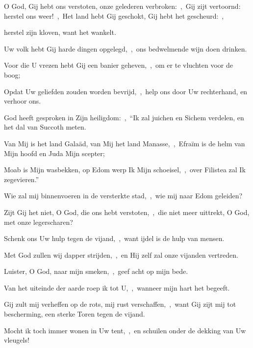 \documentclass[12pt,twoside,a5paper]{article}
\begin{document}


\begin{halfparskip}
  O God, Gij hebt ons verstoten, onze gelederen verbroken:~\sep\ Gij zijt vertoornd: herstel ons weer!~\sep\ Het land hebt Gij geschokt, Gij hebt het gescheurd:~\sep


  herstel zijn kloven, want het wankelt.

  Uw volk hebt Gij harde dingen opgelegd,~\sep\ ons bedwelmende wijn doen drinken.

  Voor die U vrezen hebt Gij een banier geheven,~\sep\ om er te vluchten voor de boog;

  Opdat Uw geliefden zouden worden bevrijd,~\sep\ help ons door Uw rechterhand, en verhoor ons.
\end{halfparskip}


\begin{halfparskip}
  God heeft gesproken in Zijn heiligdom:~\sep\ ``Ik zal juichen en Sichem verdelen, en het dal van Succoth meten.

  Van Mij is het land Galaäd, van Mij het land Manasse,~\sep\ Efraïm is de helm van Mijn hoofd en Juda Mijn scepter;

  Moab is Mijn wasbekken, op Edom werp Ik Mijn schoeisel,~\sep\ over Filistea zal Ik zegevieren.''

  Wie zal mij binnenvoeren in de versterkte stad,~\sep\ wie mij naar Edom geleiden?

  Zijt Gij het niet, O God, die ons hebt verstoten,~\sep\ die niet meer uittrekt, O God, met onze legerscharen?

  Schenk ons Uw hulp tegen de vijand,~\sep\ want ijdel is de hulp van mensen.

  Met God zullen wij dapper strijden,~\sep\ en Hij zelf zal onze vijanden vertreden.
\end{halfparskip}



\begin{halfparskip}
  Luister, O God, naar mijn smeken,~\sep\ geef acht op mijn bede.

  Van het uiteinde der aarde roep ik tot U,~\sep\ wanneer mijn hart het begeeft.


  Gij zult mij verheffen op de rots, mij rust verschaffen,~\sep\ want Gij zijt mij tot bescherming, een sterke Toren tegen de vijand.

  Mocht ik toch immer wonen in Uw tent,~\sep\ en schuilen onder de dekking van Uw vleugels!
\end{halfparskip}
\end{document}
